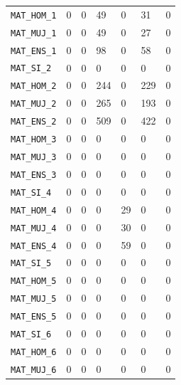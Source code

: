 \documentclass[10pt]{article}
\begin{document}
\begin{xltabular}{\linewidth}{@{}p{4.3cm} Y Y Y Y Y Y @{}}
\texttt{MAT\_\allowbreak{}HOM\_\allowbreak{}1} & 0 & 0 & 49 & 0 & 31 & 0 \\
\texttt{MAT\_\allowbreak{}MUJ\_\allowbreak{}1} & 0 & 0 & 49 & 0 & 27 & 0 \\
\texttt{MAT\_\allowbreak{}ENS\_\allowbreak{}1} & 0 & 0 & 98 & 0 & 58 & 0 \\
\texttt{MAT\_\allowbreak{}SI\_\allowbreak{}2} & 0 & 0 & 0 & 0 & 0 & 0 \\
\texttt{MAT\_\allowbreak{}HOM\_\allowbreak{}2} & 0 & 0 & 244 & 0 & 229 & 0 \\
\texttt{MAT\_\allowbreak{}MUJ\_\allowbreak{}2} & 0 & 0 & 265 & 0 & 193 & 0 \\
\texttt{MAT\_\allowbreak{}ENS\_\allowbreak{}2} & 0 & 0 & 509 & 0 & 422 & 0 \\
\texttt{MAT\_\allowbreak{}HOM\_\allowbreak{}3} & 0 & 0 & 0 & 0 & 0 & 0 \\
\texttt{MAT\_\allowbreak{}MUJ\_\allowbreak{}3} & 0 & 0 & 0 & 0 & 0 & 0 \\
\texttt{MAT\_\allowbreak{}ENS\_\allowbreak{}3} & 0 & 0 & 0 & 0 & 0 & 0 \\
\texttt{MAT\_\allowbreak{}SI\_\allowbreak{}4} & 0 & 0 & 0 & 0 & 0 & 0 \\
\texttt{MAT\_\allowbreak{}HOM\_\allowbreak{}4} & 0 & 0 & 0 & 29 & 0 & 0 \\
\texttt{MAT\_\allowbreak{}MUJ\_\allowbreak{}4} & 0 & 0 & 0 & 30 & 0 & 0 \\
\texttt{MAT\_\allowbreak{}ENS\_\allowbreak{}4} & 0 & 0 & 0 & 59 & 0 & 0 \\
\texttt{MAT\_\allowbreak{}SI\_\allowbreak{}5} & 0 & 0 & 0 & 0 & 0 & 0 \\
\texttt{MAT\_\allowbreak{}HOM\_\allowbreak{}5} & 0 & 0 & 0 & 0 & 0 & 0 \\
\texttt{MAT\_\allowbreak{}MUJ\_\allowbreak{}5} & 0 & 0 & 0 & 0 & 0 & 0 \\
\texttt{MAT\_\allowbreak{}ENS\_\allowbreak{}5} & 0 & 0 & 0 & 0 & 0 & 0 \\
\texttt{MAT\_\allowbreak{}SI\_\allowbreak{}6} & 0 & 0 & 0 & 0 & 0 & 0 \\
\texttt{MAT\_\allowbreak{}HOM\_\allowbreak{}6} & 0 & 0 & 0 & 0 & 0 & 0 \\
\texttt{MAT\_\allowbreak{}MUJ\_\allowbreak{}6} & 0 & 0 & 0 & 0 & 0 & 0 \\

\end{xltabular}
\end{document}
